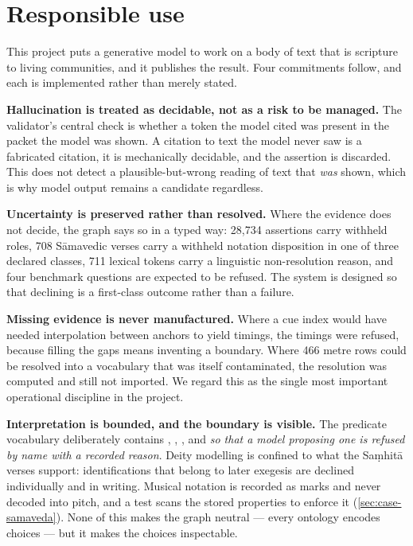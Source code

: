 \section*{Responsible use}
\label{sec:ethics}

This project puts a generative model to work on a body of text that is scripture to
living communities, and it publishes the result. Four commitments follow, and each is
implemented rather than merely stated.

\textbf{Hallucination is treated as decidable, not as a risk to be managed.} The
validator's central check is whether a token the model cited was present in the
packet the model was shown. A citation to text the model never saw is a fabricated
citation, it is mechanically decidable, and the assertion is discarded. This does not
detect a plausible-but-wrong reading of text that \emph{was} shown, which is why
model output remains a candidate regardless.

\textbf{Uncertainty is preserved rather than resolved.} Where the evidence does not
decide, the graph says so in a typed way: 28{,}734 assertions carry withheld roles,
708 S\=amavedic verses carry a withheld notation disposition in one of three declared
classes, 711 lexical tokens carry a linguistic non-resolution reason, and four
benchmark questions are expected to be refused. The system is designed so that
declining is a first-class outcome rather than a failure.

\textbf{Missing evidence is never manufactured.} Where a cue index would have needed
interpolation between anchors to yield timings, the timings were refused, because
filling the gaps means inventing a boundary. Where 466 metre rows could be resolved
into a vocabulary that was itself contaminated, the resolution was computed and still
not imported. We regard this as the single most important operational discipline in
the project.

\textbf{Interpretation is bounded, and the boundary is visible.} The predicate
vocabulary deliberately contains , ,
,  and  \emph{so that a model proposing
one is refused by name with a recorded reason}. Deity modelling is confined to what
the Sa\d{m}hit\=a verses support: identifications that belong to later exegesis are
declined individually and in writing. Musical notation is recorded as marks and never
decoded into pitch, and a test scans the stored properties to enforce it
(\cref{sec:case-samaveda}). None of this makes the graph neutral --- every
ontology encodes choices --- but it makes the choices inspectable.

